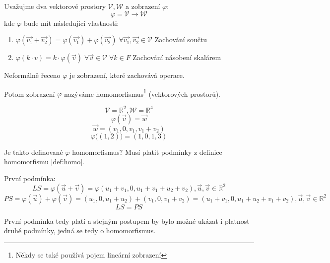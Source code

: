 \begin{definition}
    Uvažujme dva vektorové prostory $\mathcal{V}, \mathcal{W}$ a zobrazení $\varphi$:
    $$\varphi = \mathcal{V} \rightarrow \mathcal{W}$$
    kde $\varphi$ bude mít následujicí vlastnosti:
    \begin{enumerate}
        \item $\varphi(\vec{v_1} + \vec{v_2}) = \varphi(\vec{v_1}) + \varphi(\vec{v_2})\;
            \forall \vec{v_1}, \vec{v_2} \in \mathcal{V}$ \hfill Zachování součtu
        \item $\varphi(k\cdot v) = k \cdot \varphi (\vec{v}) \;
            \forall \vec{v} \in \mathcal{V} \; \forall k \in F$ \hfill Zachování násobení skalárem
    \end{enumerate}
    Neformálně řeceno $\varphi$ je zobrazení, které zachovává operace.

    Potom zobrazení $\varphi$ nazýváme homomorfismus\footnote{Někdy se také používá pojem
    lineární zobrazení} (vektorových prostorů).
    \label{def:homo}
\end{definition}

\begin{example}
    $$\mathcal{V} = \mathbb{R}^2, \mathcal{W} = \mathbb{R}^4$$
    $$\varphi(\vec{v}) = \vec{w}$$
    $$\vec{w} = (v_1, 0, v_1, v_1 + v_2)$$
    $$\varphi\big((1,2)\big) = (1, 0, 1, 3)$$

    Je takto definované $\varphi$ homomorfismus? Musí platit podmínky z definice
    homomorfismu \ref{def:homo}.

    První podmínka:
    $$LS = \varphi(\vec{u} + \vec{v}) = \varphi(u_1 + v_1, 0, u_1 + v_1 + u_2 + v_2),
    \vec{u}, \vec{v} \in \mathbb{R}^2$$
    $$PS = \varphi(\vec{u}) + \varphi(\vec{v}) = (u_1, 0, u_1 + u_2) + (v_1, 0, v_1 + v_2) =
    (u_1 + v_1, 0, u_1 + u_2 + v_1 + v_2), \vec{u}, \vec{v} \in \mathbb{R}^2$$
    $$LS = PS$$

    První podmínka tedy platí a stejným postupem by bylo možné ukázat i platnost
    druhé podmínky, jedná se tedy o homomorfismus.

\end{example}

